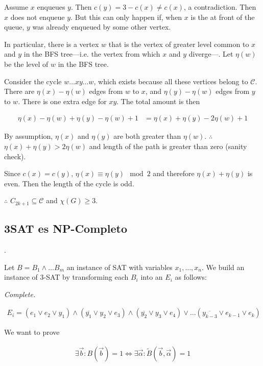 Assume $x$ enqueues $y$. Then $c(y) = 3 - c(x) \neq c(x)$, a contradiction.
Then $x$ does not enqueue $y$. But this can only happen if, when $x$ is the at
front of the queue, $y$ was already enqueued by some other vertex. 

In particular, there is a vertex $w$ that is the vertex of greater level common
to $x$ and $y$ in the BFS tree---i.e. the vertex from which $x$ and $y$
diverge---. Let $\eta(w)$ be the level of $w$ in the BFS
tree.

Consider the cycle $w \ldots x y \ldots w$, which exists because all these
vertices belong to $\mathcal{C}$. There are $\eta(x) - \eta(w)$ edges from $w$ to
$x$, and $\eta(y) - \eta(w)$ edges from $y$ to $w$. There is one 
extra edge for $xy$. The total amount is then 

\begin{align*}
    \eta(x) - \eta(w) + \eta(y) - \eta(w) + 1 &= \eta(x) + \eta(y) - 2\eta(w) + 1
\end{align*}

By assumption, $\eta(x)$ and $\eta(y)$ are both greater than $\eta(w)$.
$\therefore $ $\eta(x) + \eta(y) > 2\eta(w)$ and length of the path is greater
than zero (sanity check). 

Since $c(x) = c(y)$, $\eta(x) \equiv \eta(y) \mod 2$ and therefore $\eta(x) +
\eta(y)$ is even. Then the length of the cycle is odd. 

$\therefore $ $C_{2k+1} \subseteq \mathcal{C}$ and $\chi(G) \geq 3$.


\pagebreak

\subsection{3SAT es NP-Completo}.

Let $B = B_1 \land  \ldots B_m$ an instance of SAT with variables 
$x_1, \ldots, x_n$. We build an instance of $3$-SAT 
by transforming each $B_i$ into an $E_i$ as follows:

\textit{Complete.}

\begin{align*}
E_i = (e_1 \lor  e_2 \lor y_1) \land  (\overline{y_1} \lor  y_2 \lor  e_3) \land  (\overline{y_2} \lor  y_3 \lor  e_4) \lor \ldots (\overline{y_{k-3}} \lor e_{k-1} \lor e_{k})
\end{align*}

We want to prove

\begin{align*}
    \exists \overrightarrow{b} : B(\overrightarrow{b}) = 1 \iff \exists \overrightarrow{\alpha} : \tilde{ B }(\overrightarrow{b}, \overrightarrow{\alpha}) = 1
\end{align*}

